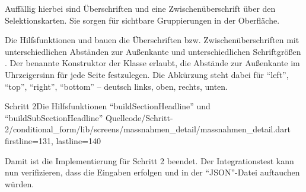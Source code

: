 Auffällig hierbei sind Überschriften  und eine Zwischenüberschrift  über den Selektionskarten. Sie sorgen für sichtbare Gruppierungen in der Oberfläche.

Die Hilfsfunktionen 
und  bauen die Überschriften  bzw. Zwischenüberschriften  mit unterschiedlichen Abständen zur Außenkante 
und unterschiedlichen Schriftgrößen .
Der benannte Konstruktor  der Klasse  erlaubt, die Abstände zur Außenkante im Uhrzeigersinn für jede Seite festzulegen.
Die Abkürzung  steht dabei für \enquote{left}, \enquote{top}, \enquote{right}, \enquote{bottom} -- deutsch links, oben, rechts, unten.

\begin{alexlisting}{Schritt 2}{Die Hilfsfunktionen \enquote{buildSectionHeadline} und \enquote{buildSubSectionHeadline}}
  {Quellcode/Schritt-2/conditional_form/lib/screens/massnahmen_detail/massnahmen_detail.dart}
  {firstline=131, lastline=140}
  \label{lst:Schritt2buildSectionHeadlineBuildSubSectionHeadline}
\end{alexlisting}

Damit ist die Implementierung für Schritt 2 beendet.
Der Integrationstest kann nun verifizieren,
dass die Eingaben erfolgen und in der \enquote{JSON}-Datei auftauchen würden.

